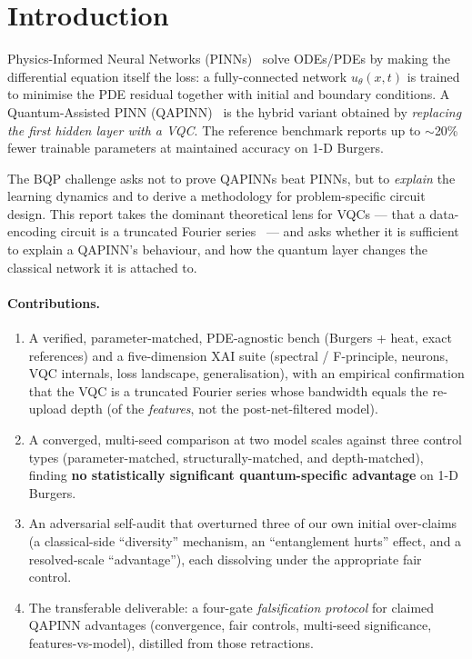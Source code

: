 \documentclass[11pt]{article}
\begin{document}
\tableofcontents
\newpage

\section{Introduction}
Physics-Informed Neural Networks (PINNs)~\cite{raissi} solve ODEs/PDEs by making
the differential equation itself the loss: a fully-connected network
$u_\theta(x,t)$ is trained to minimise the PDE residual together with initial and
boundary conditions. A Quantum-Assisted PINN (QAPINN)~\cite{qapinn} is the hybrid
variant obtained by \emph{replacing the first hidden layer with a VQC}. The
reference benchmark reports up to $\sim$20\% fewer trainable parameters at
maintained accuracy on 1-D Burgers.

The BQP challenge asks not to prove QAPINNs beat PINNs, but to \emph{explain} the
learning dynamics and to derive a methodology for problem-specific circuit design.
This report takes the dominant theoretical lens for VQCs --- that a data-encoding
circuit is a truncated Fourier series~\cite{schuld} --- and asks whether it is
sufficient to explain a QAPINN's behaviour, and how the quantum layer changes the
classical network it is attached to.

\paragraph{Contributions.}
\begin{enumerate}[nosep]
  \item A verified, parameter-matched, PDE-agnostic bench (Burgers + heat, exact
  references) and a five-dimension XAI suite (spectral / F-principle, neurons,
  VQC internals, loss landscape, generalisation), with an empirical confirmation
  that the VQC is a truncated Fourier series whose bandwidth equals the re-upload
  depth (of the \emph{features}, not the post-net-filtered model).
  \item A converged, multi-seed comparison at two model scales against three
  control types (parameter-matched, structurally-matched, and depth-matched),
  finding \textbf{no statistically significant quantum-specific advantage} on 1-D
  Burgers.
  \item An adversarial self-audit that overturned three of our own initial
  over-claims (a classical-side ``diversity'' mechanism, an ``entanglement hurts''
  effect, and a resolved-scale ``advantage''), each dissolving under the appropriate
  fair control.
  \item The transferable deliverable: a four-gate \emph{falsification protocol} for
  claimed QAPINN advantages (convergence, fair controls, multi-seed significance,
  features-vs-model), distilled from those retractions.
\end{enumerate}
\end{document}
